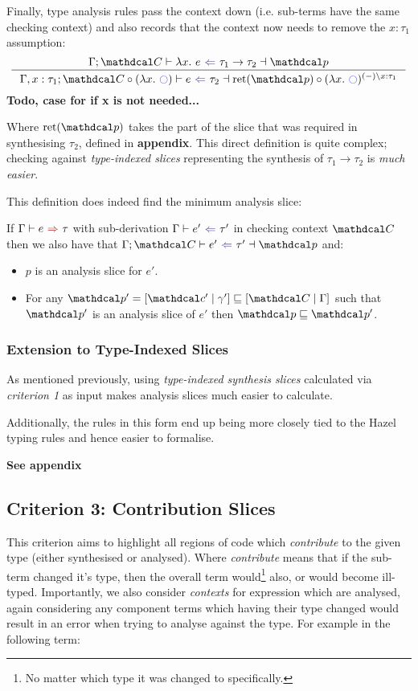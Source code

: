 Finally, type analysis rules pass the context down (i.e. sub-terms have the same checking context) and also records that the context now needs to remove the $x:\tau_1$ assumption:
\[\inference{\analysisslice{\C}{\lambda x.\ e}{\tau_1 \to \tau_2}{\p}}{\analysisslice[\Gamma, x:\tau_1]{\C \circ (\lambda x.\ \cmark)}{e}{\tau_2}{\mathrm{ret}(\p)}\circ(\lambda x.\ \cmark)^{(-)\backslash x:\tau_1}}\]
\textbf{Todo, case for if x is not needed...}


Where $\mathrm{ret}(\p)$ takes the part of the slice that was required in synthesising $\tau_2$, defined in \textbf{appendix}. This direct definition is quite complex; checking against \textit{type-indexed slices} representing the synthesis of $\tau_1 \to \tau_2$ is \textit{much easier}.

This definition does indeed find the minimum analysis slice:
\begin{conjecture}[Correctness]\label{conj:AnalysisSliceCorrectness}
If $\synthesis{e}{\tau}$ with sub-derivation $\analysis{e'}{\tau'}$ in checking context $\C$ then we also have that $\analysisslice{\C}{e'}{\tau'}{\p}$ and:
\begin{itemize}
\item $p$ is an analysis slice for $e'$.
\item For any $\p' = [\Cs' \mid \gamma'] \sqsubseteq [\C\mid \Gamma]$ such that $\p'$ is an analysis slice of $e'$ then $\p \sqsubseteq \p'$.
\end{itemize}
\end{conjecture}

\subsubsection{Extension to Type-Indexed Slices}
As mentioned previously, using \textit{type-indexed synthesis slices} calculated via \textit{criterion 1} as input makes analysis slices much easier to calculate. 

Additionally, the rules in this form end up being more closely tied to the Hazel typing rules and hence easier to formalise.

\textbf{See appendix}

\subsection{Criterion 3: Contribution Slices}
This criterion aims to highlight all regions of code which \textit{contribute} to the given type (either synthesised or analysed). Where \textit{contribute} means that if the sub-term changed it's type, then the overall term would\footnote{No matter which type it was changed to specifically.} also, or would become ill-typed. Importantly, we also consider \textit{contexts} for expression which are analysed, again considering any component terms which having their type changed would result in an error when trying to analyse against the type. For example in the following term:

